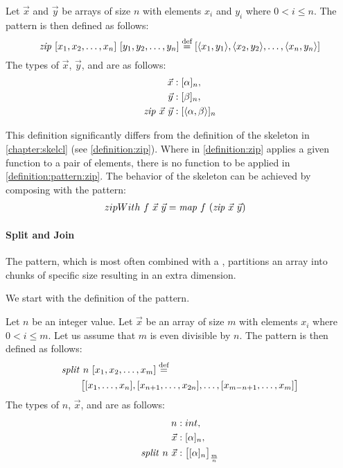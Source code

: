 \begin{definition}
  \label{definition:pattern:zip}
  Let $\vec{x}$ and $\vec{y}$ be arrays of size $n$ with elements $x_i$ and $y_i$ where $0 < i \leq n$.
  The \zip pattern is then defined as follows:
  \begin{equation*}
    \text{\textit{zip}}\ [x_1, x_2, \dots, x_n]\ [y_1, y_2, \dots, y_n]\\
      \stackrel{\textrm{\scriptsize def}}{=} [\langle x_1, y_1\rangle, \langle x_2, y_2\rangle, \dots, \langle x_n, y_n\rangle]
  \end{equation*}
  The types of $\vec{x}$, $\vec{y}$, and \zip are as follows:
  \begin{align*}
    \vec{x} &: [\alpha]_n,\\
    \vec{y} &: [\beta]_n,\\
    \text{\textit{zip}}\ \vec{x}\ \vec{y} &: [\langle\alpha, \beta\rangle]_n
  \end{align*}
\end{definition}

\noindent
This definition significantly differs from the definition of the \zip skeleton in \autoref{chapter:skelcl} (see \autoref{definition:zip}).
Where in \autoref{definition:zip} \zip applies a given function to a pair of elements, there is no function to be applied in \autoref{definition:pattern:zip}.
The behavior of the \zip skeleton can be achieved by composing \zip with the \map pattern:
\begin{align*}
  zipWith\ f\ \vec{x}\ \vec{y} &= \text{\textit{map}}\ f\ (\text{\textit{zip}}\ \vec{x}\ \vec{y})
\end{align*}


\paragraph{Split and Join}
The \splitN pattern, which is most often combined with a \join, partitions an array into chunks of specific size resulting in an extra dimension.

We start with the definition of the \splitN pattern.
\begin{definition}
  \label{definition:pattern:split}
  Let $n$ be an integer value.
  Let $\vec{x}$ be an array of size $m$ with elements $x_i$ where $0 < i \leq m$.
  Let us assume that $m$ is even divisible by $n$.
  The \splitN pattern is then defined as follows:
  \begin{align*}
    &\text{\textit{split}}\ n\ [x_1, x_2, \dots, x_m] \stackrel{\textrm{\scriptsize def}}{=}\\
    &\qquad\big[[x_1, \ldots, x_n], [x_{n+1}, \ldots, x_{2n}], \ldots, [x_{m-n+1}, \ldots, x_m]\big]
  \end{align*}
  The types of $n$, $\vec{x}$, and \splitN are as follows:
  \begin{align*}
    n &: int,\\
    \vec{x} &: [\alpha]_n,\\
    \text{\textit{split}}\ n\ \vec{x} &: \big[[\alpha]_n\big]_{\frac{m}{n}}
  \end{align*}
\end{definition}

